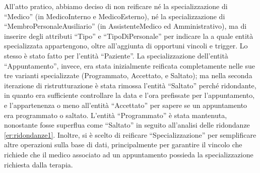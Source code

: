 \documentclass[11pt]{article}
\begin{document}
All'atto pratico, abbiamo deciso di non reificare né la specializzazione di ``Medico'' (in MedicoInterno e MedicoEsterno), né la specializzazione di ``MembroPersonaleAusiliario'' (in AssistenteMedico ed Amministrativo), ma di inserire degli attributi ``Tipo'' e ``TipoDiPersonale'' per indicare la a quale entità specializzata appartengono, oltre all'aggiunta di opportuni vincoli e trigger. Lo stesso è stato fatto per l'entità ``Paziente''.
La specializzazione dell'entità ``Appuntamento'', invece, era stata inizialmente reificata completamente nelle sue tre varianti specializzate (Programmato, Accettato, e Saltato); ma nella seconda iterazione di ristrutturazione è stata rimossa l'entità ``Saltato'' perché ridondante, in quanto era sufficiente controllare la data e l'ora prefissate per l'appuntamento, e l'appartenenza o meno all'entità ``Accettato'' per sapere se un appuntamento era programmato o saltato. L'entità ``Programmato'' è stata mantenuta, nonostante fosse superflua come ``Saltato'' in seguito all'analisi delle ridondanze \ref{er:ridondanze1}. Inoltre, si è scelto di reificare ``Specializzazione'' per semplificare altre operazioni sulla base di dati, principalmente per garantire il vincolo che richiede che il medico associato ad un appuntamento possieda la specializzazione richiesta dalla terapia.
\end{document}
